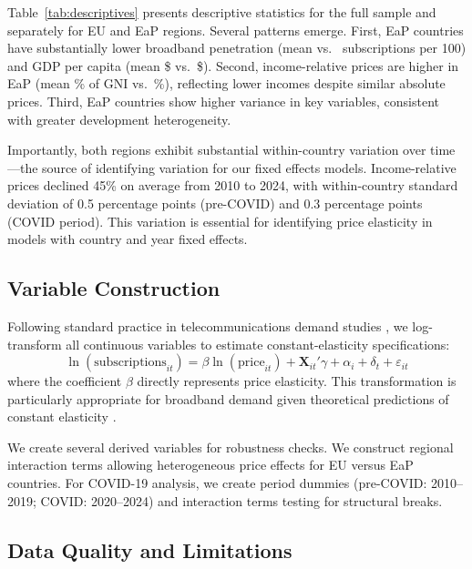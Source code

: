Table~\ref{tab:descriptives} presents descriptive statistics for the full sample and separately for EU and EaP regions. Several patterns emerge. First, EaP countries have substantially lower broadband penetration (mean \DescSubsEaP{} vs.\ \DescSubsEU{} subscriptions per 100) and GDP per capita (mean \$\DescGDPEaP{} vs.\ \$\DescGDPEU). Second, income-relative prices are higher in EaP (mean \DescPriceGNIEaP\% of GNI vs.\ \DescPriceGNIEU\%), reflecting lower incomes despite similar absolute prices. Third, EaP countries show higher variance in key variables, consistent with greater development heterogeneity.

Importantly, both regions exhibit substantial within-country variation over time---the source of identifying variation for our fixed effects models. Income-relative prices declined 45\% on average from 2010 to 2024, with within-country standard deviation of 0.5 percentage points (pre-COVID) and 0.3 percentage points (COVID period). This variation is essential for identifying price elasticity in models with country and year fixed effects.

\subsection{Variable Construction}

Following standard practice in telecommunications demand studies \citep{dauvin2014estimating, madden2015demand}, we log-transform all continuous variables to estimate constant-elasticity specifications:
\begin{equation}
    \ln(\text{subscriptions}_{it}) = \beta \ln(\text{price}_{it}) + \mathbf{X}_{it}'\gamma + \alpha_i + \delta_t + \varepsilon_{it}
\end{equation}
where the coefficient $\beta$ directly represents price elasticity. This transformation is particularly appropriate for broadband demand given theoretical predictions of constant elasticity \citep{hausman2001private}.

We create several derived variables for robustness checks. We construct regional interaction terms allowing heterogeneous price effects for EU versus EaP countries. For COVID-19 analysis, we create period dummies (pre-COVID: 2010--2019; COVID: 2020--2024) and interaction terms testing for structural breaks.

\subsection{Data Quality and Limitations}

